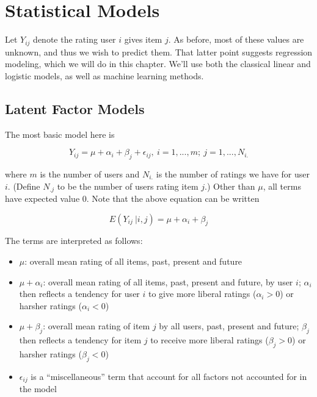 
\chapter{Statistical Models}  
\label{chap:mixed}  

Let $Y_{ij}$ denote the rating user $i$ gives item $j$.   As before,
most of these values are unknown, and thus we wish to predict them.
That latter point suggests regression modeling, which we will do in this
chapter.  We'll use both the classical linear and logistic models, as
well as machine learning methods.

\section{Latent Factor Models} 

The most basic model here is

\begin{equation}
\label{yij}
Y_{ij} = \mu + \alpha_i + \beta_j + \epsilon_{ij},~ i = 1,...,m;~ j =
1,...,N_{i.}
\end{equation}

where $m$ is the number of users and $N_{i.}$ is the number of ratings
we have for user $i$.  (Define $N_{.j}$ to be the number of users rating
item $j$.) Other than $\mu$, all terms have expected value 0.  Note that
the above equation can be written

\begin{equation}
E(Y_{ij} ~| i,j) = \mu + \alpha_i + \beta_j
\end{equation}

The terms are interpreted as follows:

\begin{itemize}

\item $\mu$:  overall mean rating of all items, past, present and future

\item $\mu + \alpha_i$: overall mean rating of all items, past, present
and future, by user $i$; $\alpha_i$ then reflects a tendency for user
$i$ to give more liberal ratings ($\alpha_i >0$) or harsher ratings
($\alpha_i < 0$)

\item $\mu + \beta_j$: overall mean rating of item $j$ by all users,
past, present and future; $\beta_j$ then reflects a tendency for item
$j$ to receive more liberal ratings ($\beta_j >0$) or harsher ratings
($\beta_j < 0$)

\item $\epsilon_{ij}$ is a ``miscellaneous'' term that account for
all factors not accounted for in the model

\end{itemize} 

